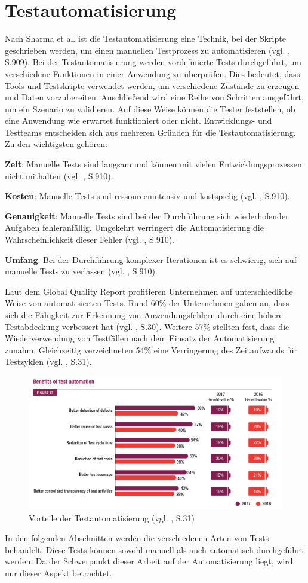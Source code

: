 \section{Testautomatisierung}

Nach Sharma et al. ist die Testautomatisierung eine Technik,
bei der Skripte geschrieben werden, um einen manuellen
Testprozess zu automatisieren (vgl. \cite{sharma2014web}, S.909). Bei der
Testautomatisierung werden vordefinierte Tests durchgeführt,
um verschiedene Funktionen in einer Anwendung zu überprüfen.
Dies bedeutet, dass Tools und Testskripte verwendet werden, um verschiedene
Zustände zu erzeugen und Daten vorzubereiten. Anschließend wird eine
Reihe von Schritten ausgeführt, um ein Szenario zu validieren.
Auf diese Weise können die Tester feststellen, ob eine Anwendung
wie erwartet funktioniert oder nicht. Entwicklungs- und Testteams
entscheiden sich aus mehreren Gründen für die Testautomatisierung.
Zu den wichtigsten gehören:

\textbf{Zeit}: Manuelle Tests sind langsam und können mit vielen Entwicklungsprozessen
nicht mithalten (vgl. \cite{sharma2014web}, S.910).


\textbf{Kosten}: Manuelle Tests sind ressourcenintensiv und kostspielig
(vgl. \cite{sharma2014web}, S.910).


\textbf{Genauigkeit}: Manuelle Tests sind bei der Durchführung sich wiederholender
Aufgaben fehleranfällig. Umgekehrt verringert die Automatisierung die
Wahrscheinlichkeit dieser Fehler (vgl. \cite{sharma2014web}, S.910).


\textbf{Umfang}: Bei der Durchführung komplexer Iterationen ist es schwierig,
sich auf manuelle Tests zu verlassen (vgl. \cite{sharma2014web}, S.910).


Laut dem Global Quality Report profitieren Unternehmen auf unterschiedliche
Weise von automatisierten Tests. Rund 60\% der Unternehmen gaben an,
dass sich die Fähigkeit zur Erkennung von Anwendungsfehlern durch eine höhere
Testabdeckung verbessert hat (vgl. \cite{Buenen201718}, S.30). Weitere 57\% stellten fest, dass die Wiederverwendung von Testfällen nach
dem Einsatz der Automatisierung zunahm. Gleichzeitig verzeichneten 54\%
eine Verringerung des Zeitaufwands für
Testzyklen (vgl. \cite{Buenen201718}, S.31).

\begin{figure}
    \centering
    \includegraphics[scale=1.3]{images/benefits_of_test_automation}
    \caption{Vorteile der Testautomatisierung (vgl. \cite{Buenen201718}, S.31)} \label{fig:mof}
\end{figure}

In den folgenden Abschnitten werden die verschiedenen Arten von Tests
behandelt. Diese Tests können sowohl manuell als auch automatisch
durchgeführt werden. Da der Schwerpunkt dieser Arbeit auf der
Automatisierung liegt, wird nur dieser Aspekt betrachtet.

